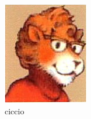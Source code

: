 \documentclass[a4paper,10pt]{report}
\begin{document}
\lipsum[1]

\begin{figure}[htb]
\centering
	\includegraphics[bb= 0 0 100 120]{lion}
	\caption{ciccio}
\end{figure}


\lipsum[2]
\end{document}
